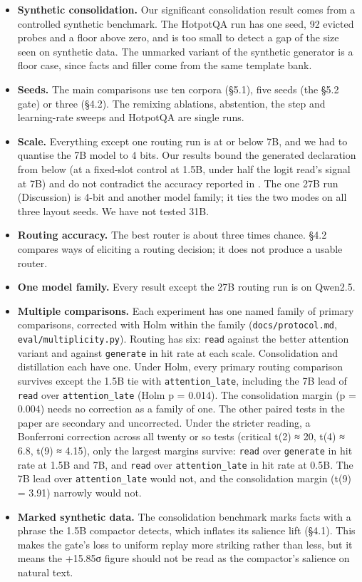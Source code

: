 \documentclass[10pt]{article}
\providecommand{\tightlist}{\setlength{\itemsep}{0pt}\setlength{\parskip}{0pt}}
\begin{document}
\begin{itemize}
\tightlist
\item
  \textbf{Synthetic consolidation.} Our significant consolidation result comes from a controlled
  synthetic benchmark. The HotpotQA run has one seed, 92 evicted probes and a floor above
  zero, and is too small to detect a gap of the size seen on synthetic data. The unmarked
  variant of the synthetic generator is a floor case, since facts and filler come from the
  same template bank.
\item
  \textbf{Seeds.} The main comparisons use ten corpora (§5.1), five seeds (the §5.2 gate) or three
  (§4.2). The remixing ablations, abstention, the step and learning-rate sweeps and HotpotQA
  are single runs.
\item
  \textbf{Scale.} Everything except one routing run is at or below 7B, and we had to quantise the 7B model to
  4 bits. Our results bound the generated declaration from below (at a fixed-slot control at 1.5B, under half the
  logit read's signal at 7B) and do not contradict the accuracy reported in \citet{ho2026attention}. The one 27B
  run (Discussion) is 4-bit and another model family; it ties the two modes on all three layout seeds. We have not tested
  31B.
\item
  \textbf{Routing accuracy.} The best router is about three times chance. §4.2 compares ways of
  eliciting a routing decision; it does not produce a usable router.
\item
  \textbf{One model family.} Every result except the 27B routing run is on Qwen2.5.
\item
  \textbf{Multiple comparisons.} Each experiment has one named family of primary comparisons,
  corrected with Holm within the family (\texttt{docs/protocol.md}, \texttt{eval/multiplicity.py}). Routing
  has six: \texttt{read} against the better attention variant and against \texttt{generate} in hit rate at
  each scale. Consolidation and distillation each have one. Under Holm, every primary routing
  comparison survives except the 1.5B tie with \texttt{attention\_late}, including the 7B lead of
  \texttt{read} over \texttt{attention\_late} (Holm p = 0.014). The consolidation margin (p = 0.004) needs no
  correction as a family of one. The other paired tests in the paper are secondary and
  uncorrected. Under the stricter reading, a Bonferroni correction across all twenty or so
  tests (critical t(2) ≈ 20, t(4) ≈ 6.8, t(9) ≈ 4.15), only the largest margins survive:
  \texttt{read} over \texttt{generate} in hit rate at 1.5B and 7B, and \texttt{read} over \texttt{attention\_late} in hit
  rate at 0.5B. The 7B lead over \texttt{attention\_late} would not, and the consolidation margin
  (t(9) = 3.91) narrowly would not.
\item
  \textbf{Marked synthetic data.} The consolidation benchmark marks facts with a phrase the 1.5B
  compactor detects, which inflates its salience lift (§4.1). This makes the gate's loss to
  uniform replay more striking rather than less, but it means the +15.85σ figure should not
  be read as the compactor's salience on natural text.
\end{itemize}
\end{document}
